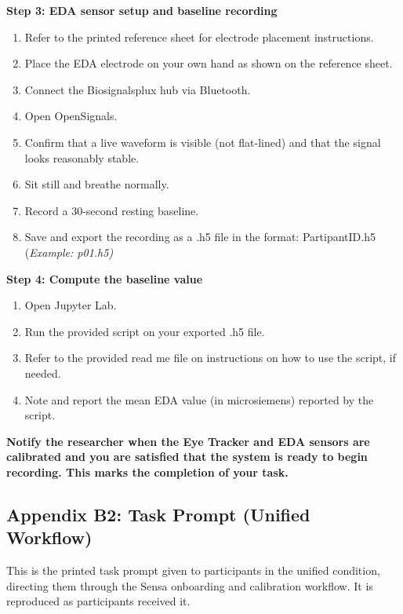 \documentclass[
]{article}
\begin{document}
\textbf{Step 3: EDA sensor setup and baseline recording}

\begin{enumerate}
\def\labelenumi{\arabic{enumi}.}
\item
  Refer to the printed reference sheet for electrode placement instructions.
\item
  Place the EDA electrode on your own hand as shown on the reference sheet.
\item
  Connect the Biosignalsplux hub via Bluetooth.
\item
  Open OpenSignals.
\item
  Confirm that a live waveform is visible (not flat-lined) and that the signal looks reasonably stable.
\item
  Sit still and breathe normally.
\item
  Record a 30-second resting baseline.
\item
  Save and export the recording as a .h5 file in the format: PartipantID.h5 (\emph{Example: p01.h5)}
\end{enumerate}

\textbf{Step 4: Compute the baseline value}

\begin{enumerate}
\def\labelenumi{\arabic{enumi}.}
\item
  Open Jupyter Lab.
\item
  Run the provided script on your exported .h5 file.
\item
  Refer to the provided read me file on instructions on how to use the script, if needed.
\item
  Note and report the mean EDA value (in microsiemens) reported by the script.
\end{enumerate}

\textbf{Notify the researcher when the Eye Tracker and EDA sensors are calibrated and you are satisfied that the system is ready to begin recording. This marks the completion of your task.}

\clearpage
\hypertarget{appendix-a2-task-prompt-unified-workflow}{%
\subsection{Appendix B2: Task Prompt (Unified Workflow)}\label{appendix-a2-task-prompt-unified-workflow}}

This is the printed task prompt given to participants in the unified condition, directing them through the Sensa onboarding and calibration workflow. It is reproduced as participants received it.
\end{document}
